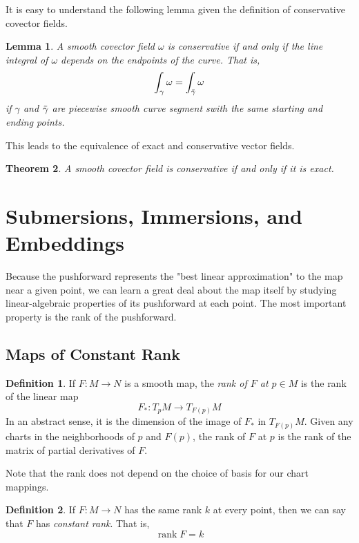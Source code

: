 \documentclass{article}
\DeclareMathOperator{\rank}{rank}
\newtheorem{theorem}{Theorem}[section]
\newtheorem{lemma}[theorem]{Lemma}
\theoremstyle{remark}
\theoremstyle{definition}
\newtheorem{definition}{Definition}[section]
\begin{document}
    It is easy to understand the following lemma given the definition of conservative covector fields. 

    \begin{lemma}
    A smooth covector field $\omega$ is conservative if and only if the line integral of $\omega$ depends on the endpoints of the curve. That is, 
    \[\int_\gamma \omega = \int_{\Tilde{\gamma}} \omega\]
    if $\gamma$ and $\Tilde{\gamma}$ are piecewise smooth curve segment swith the same starting and ending points. 
    \end{lemma}

    This leads to the equivalence of exact and conservative vector fields. 

    \begin{theorem}
    A smooth covector field is conservative if and only if it is exact. 
    \end{theorem}

\section{Submersions, Immersions, and Embeddings}

  Because the pushforward represents the "best linear approximation" to the map near a given point, we can learn a great deal about the map itself by studying linear-algebraic properties of its pushforward at each point. The most important property is the rank of the pushforward. 

  \subsection{Maps of Constant Rank}

    \begin{definition}
    If $F: M \longrightarrow N$ is a smooth map, the \textit{rank of $F$ at $p \in M$} is the rank of the linear map 
    \[F_*: T_p M \longrightarrow T_{F(p)}M\]
    In an abstract sense, it is the dimension of the image of $F_*$ in $T_{F(p)} M$. Given any charts in the neighborhoods of $p$ and $F(p)$, the rank of $F$ at $p$ is the rank of the matrix of partial derivatives of $F$. 
    \end{definition}

    Note that the rank does not depend on the choice of basis for our chart mappings. 

    \begin{definition}
    If $F: M \longrightarrow N$ has the same rank $k$ at every point, then we can say that $F$ has \textit{constant rank}. That is, 
    \[\rank{F} = k\]
    \end{definition}
\end{document}
